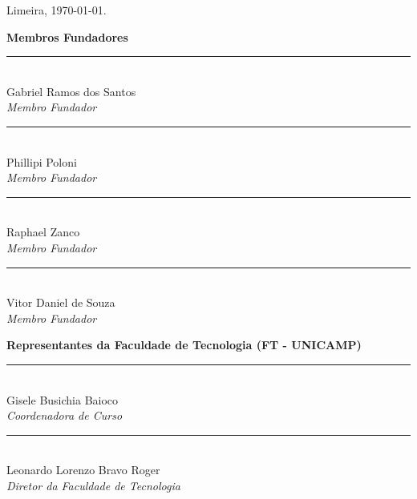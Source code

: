 \documentclass[12pt, a4paper]{article}
\begin{document}
\bigskip
\bigskip
\begin{center}
    Limeira, \today.
\end{center}


\newpage %

\vspace*{\fill} %

\begin{center}

\textbf{Membros Fundadores}
\vspace{2cm}

\begin{minipage}{0.45\textwidth}
    \centering
    \rule{6cm}{0.4pt} \\
    Gabriel Ramos dos Santos \\
    \textit{Membro Fundador}
\end{minipage}
\hspace{0.05\textwidth}
\begin{minipage}{0.45\textwidth}
    \centering
    \rule{6cm}{0.4pt} \\
    Phillipi Poloni \\
    \textit{Membro Fundador}
\end{minipage}

\vspace{2cm}

\begin{minipage}{0.45\textwidth}
    \centering
    \rule{6cm}{0.4pt} \\
    Raphael Zanco \\
    \textit{Membro Fundador}
\end{minipage}
\hspace{0.05\textwidth}
\begin{minipage}{0.45\textwidth}
    \centering
    \rule{6cm}{0.4pt} \\
    Vitor Daniel de Souza \\
    \textit{Membro Fundador}
\end{minipage}

\vspace{2cm}

\textbf{Representantes da Faculdade de Tecnologia (FT - UNICAMP)}
\vspace{2cm}

\begin{minipage}{0.45\textwidth}
    \centering
    \rule{6cm}{0.4pt} \\
    Gisele Busichia Baioco \\
    \textit{Coordenadora de Curso}
\end{minipage}
\hspace{0.05\textwidth}
\begin{minipage}{0.45\textwidth}
    \centering
    \rule{6cm}{0.4pt} \\
    Leonardo Lorenzo Bravo Roger \\
    \textit{Diretor da Faculdade de Tecnologia}
\end{minipage}

\end{center}
\end{document}
